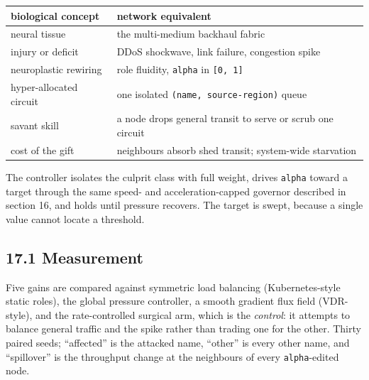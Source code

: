 \documentclass[
  american,
  11pt,
]{article}
\newcounter{none} %
\begin{document}
{\def\LTcaptype{none} %
\begin{longtable}[]{@{}
  >{\raggedright\arraybackslash}p{}
  >{\raggedright\arraybackslash}p{}@{}}
\toprule\noalign{}
\begin{minipage}[b]{\linewidth}\raggedright
biological concept
\end{minipage} & \begin{minipage}[b]{\linewidth}\raggedright
network equivalent
\end{minipage} \\
\midrule\noalign{}
\endhead
\bottomrule\noalign{}
\endlastfoot
neural tissue & the multi-medium backhaul fabric \\
injury or deficit & DDoS shockwave, link failure, congestion spike \\
neuroplastic rewiring & role fluidity, \texttt{alpha} in
\texttt{{[}0,\ 1{]}} \\
hyper-allocated circuit & one isolated \texttt{(name,\ source-region)}
queue \\
savant skill & a node drops general transit to serve or scrub one
circuit \\
cost of the gift & neighbours absorb shed transit; system-wide
starvation \\
\end{longtable}
}

The controller isolates the culprit class with full weight, drives
\texttt{alpha} toward a target through the same speed- and
acceleration-capped governor described in section 16, and holds until
pressure recovers. The target is swept, because a single value cannot
locate a threshold.

\subsection{17.1 Measurement}\label{measurement-1}

Five gains are compared against symmetric load balancing
(Kubernetes-style static roles), the global pressure controller, a
smooth gradient flux field (VDR-style), and the rate-controlled surgical
arm, which is the \emph{control}: it attempts to balance general traffic
and the spike rather than trading one for the other. Thirty paired
seeds; ``affected'' is the attacked name, ``other'' is every other name,
and ``spillover'' is the throughput change at the neighbours of every
\texttt{alpha}-edited node.
\end{document}
